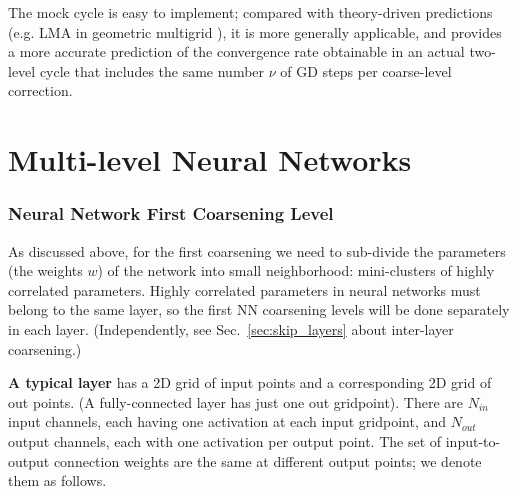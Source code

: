 \documentclass{article} %
\begin{document}
The mock cycle is easy to implement; compared with theory-driven predictions (e.g. LMA in geometric multigrid \cite[Sec.~2.1]{guide}), it is more generally applicable, and provides a more accurate prediction of the convergence rate obtainable in an actual two-level cycle that includes the same number $\nu$ of GD steps per coarse-level correction.


\newpage
\part{Multi-level Neural Networks}
\label{sec:nn}

\section{Neural Network First Coarsening Level}
\label{sec:nn_coarse1}

As discussed above, for the first coarsening we need to sub-divide the parameters (the weights $w$) of the network into small neighborhood: mini-clusters of highly correlated parameters. Highly correlated parameters in neural networks must belong to the same layer, so the first NN coarsening levels will be done separately in each layer. (Independently, see Sec.~\ref{sec:skip_layers} about inter-layer coarsening.)

\textbf{A typical layer} has a 2D grid of input points and a corresponding 2D grid of out points. (A fully-connected layer has just one out gridpoint). There are $N_{in}$ input channels, each having one activation at each input gridpoint, and $N_{out}$ output channels, each with one activation per output point. The set of input-to-output connection weights are the same at different output points; we denote them as follows.
\end{document}

